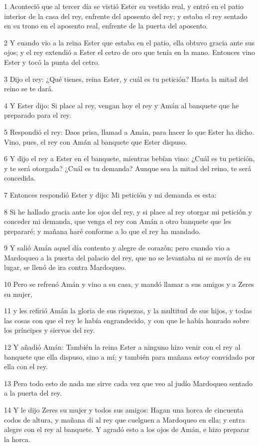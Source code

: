 \par 1 Aconteció que al tercer día se vistió Ester su vestido real, y entró en el patio interior de la casa del rey, enfrente del aposento del rey; y estaba el rey sentado en su trono en el aposento real, enfrente de la puerta del aposento.
\par 2 Y cuando vio a la reina Ester que estaba en el patio, ella obtuvo gracia ante sus ojos; y el rey extendió a Ester el cetro de oro que tenía en la mano. Entonces vino Ester y tocó la punta del cetro.
\par 3 Dijo el rey: ¿Qué tienes, reina Ester, y cuál es tu petición? Hasta la mitad del reino se te dará.
\par 4 Y Ester dijo: Si place al rey, vengan hoy el rey y Amán al banquete que he preparado para el rey.
\par 5 Respondió el rey: Daos prisa, llamad a Amán, para hacer lo que Ester ha dicho. Vino, pues, el rey con Amán al banquete que Ester dispuso. 
\par 6 Y dijo el rey a Ester en el banquete, mientras bebían vino: ¿Cuál es tu petición, y te será otorgada? ¿Cuál es tu demanda? Aunque sea la mitad del reino, te será concedida.
\par 7 Entonces respondió Ester y dijo: Mi petición y mi demanda es esta:
\par 8 Si he hallado gracia ante los ojos del rey, y si place al rey otorgar mi petición y conceder mi demanda, que venga el rey con Amán a otro banquete que les prepararé; y mañana haré conforme a lo que el rey ha mandado.
\par 9 Y salió Amán aquel día contento y alegre de corazón; pero cuando vio a Mardoqueo a la puerta del palacio del rey, que no se levantaba ni se movía de su lugar, se llenó de ira contra Mardoqueo.
\par 10 Pero se refrenó Amán y vino a su casa, y mandó llamar a sus amigos y a Zeres su mujer,
\par 11 y les refirió Amán la gloria de sus riquezas, y la multitud de sus hijos, y todas las cosas con que el rey le había engrandecido, y con que le había honrado sobre los príncipes y siervos del rey.
\par 12 Y añadió Amán: También la reina Ester a ninguno hizo venir con el rey al banquete que ella dispuso, sino a mí; y también para mañana estoy convidado por ella con el rey.
\par 13 Pero todo esto de nada me sirve cada vez que veo al judío Mardoqueo sentado a la puerta del rey.
\par 14 Y le dijo Zeres su mujer y todos sus amigos: Hagan una horca de cincuenta codos   de altura, y mañana di al rey que cuelguen a Mardoqueo en ella; y entra alegre con el rey al banquete. Y agradó esto a los ojos de Amán, e hizo preparar la horca.


